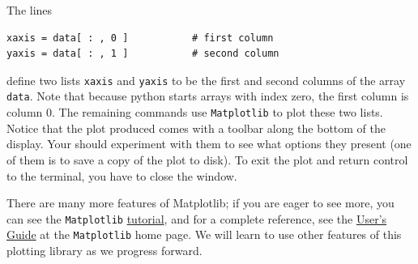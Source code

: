 The lines
\begin{lstlisting}[frame=none]
xaxis = data[ : , 0 ]			# first column
yaxis = data[ : , 1 ]			# second column
\end{lstlisting}
define two lists \verb!xaxis! and \verb!yaxis! to be the first and second columns of the array \verb!data!. Note that because python starts arrays with index zero, the first column is column 0. 
The remaining commands use \verb!Matplotlib! to plot these two lists. Notice that the plot produced comes with a toolbar along the bottom of the display. Your should experiment with them to see what options they present (one of them is to save a copy of the plot to disk). To exit the plot and return control to the terminal, you have to close the window. 

There are many more features of Matplotlib; if you are eager to see more, you can see the \verb!Matplotlib! \href{http://matplotlib.sourceforge.net/tutorial.html}{tutorial}, and for a complete reference, see the \href{http://matplotlib.sourceforge.net/}{User's Guide} at the \verb!Matplotlib! home page. We will learn to use other features of this plotting library as we progress forward. 

